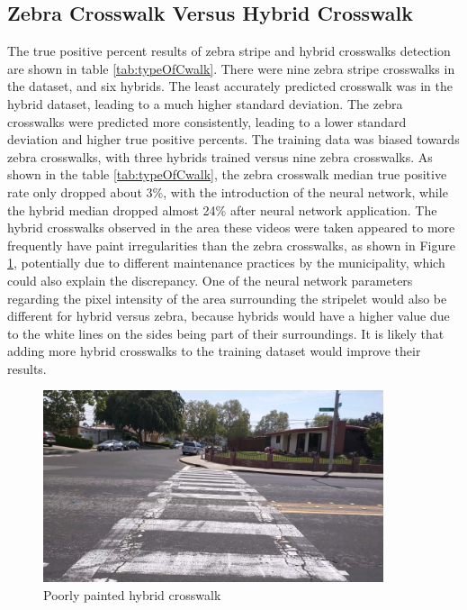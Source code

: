 \subsection{Zebra Crosswalk Versus Hybrid Crosswalk}

The true positive percent results of zebra stripe and hybrid crosswalks detection are shown in table \ref{tab:typeOfCwalk}. There were nine zebra stripe crosswalks in the dataset, and six hybrids. The least accurately predicted crosswalk was in the hybrid dataset, leading to a much higher standard deviation. The zebra crosswalks were predicted more consistently, leading to a lower standard deviation and higher true positive percents. The training data was biased towards zebra crosswalks, with three hybrids trained versus nine zebra crosswalks. As shown in the table \ref{tab:typeOfCwalk}, the zebra crosswalk median true positive rate only dropped about 3\%, with the introduction of the neural network, while the hybrid median dropped almost 24\% after neural network application. The hybrid crosswalks observed in the area these videos were taken appeared to more frequently have paint irregularities than the zebra crosswalks, as shown in Figure \ref{fig:poorlyPaintedHybrid}, potentially due to different maintenance practices by the municipality, which could also explain the discrepancy. One of the neural network parameters regarding the pixel intensity of the area surrounding the stripelet would also be different for hybrid versus zebra, because hybrids would have a higher value due to the white lines on the sides being part of their surroundings. It is likely that adding more hybrid crosswalks to the training dataset would improve their results.

\begin{figure}[t]
\begin{center}
\includegraphics[width=10cm]{figures/PoorlyPaintedHybrid.png}
\captionfonts
\caption{Poorly painted hybrid crosswalk}
\label{fig:poorlyPaintedHybrid}
\end{center}
\end{figure}

